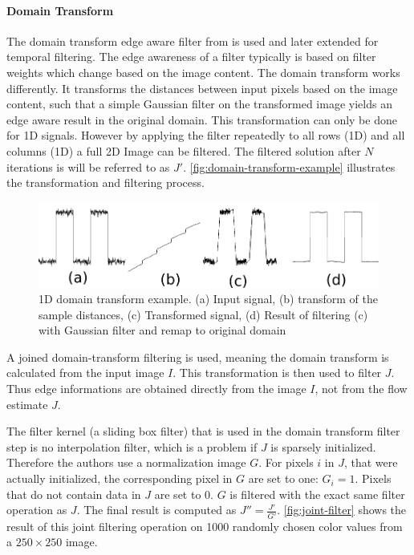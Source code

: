 \documentclass{utue} %
\begin{document}
\paragraph{Domain Transform} \label{domain-transform}
The domain transform edge aware filter from
\cite{GastalOliveira2011DomainTransform} is used and later extended for temporal
filtering. The edge awareness of a filter typically is based on filter weights
which change based on the image content. The domain transform works differently.
It transforms the distances between input pixels based on the image content,
such that a simple Gaussian filter on the transformed image yields an edge aware
result in the original domain. This transformation can only be done for 1D
signals.  However by applying the filter repeatedly to all rows (1D) and all
columns (1D) a full 2D Image can be filtered. The filtered solution after $N$
iterations is will be referred to as $J'$.
\autoref{fig:domain-transform-example} illustrates the transformation and
filtering process.

\begin{figure}[h!]
  \centering
  \includegraphics[width=.5\textwidth]{images/domain-transform.png}
  \caption{1D domain transform example. (a) Input signal, (b) transform
  of the sample distances, (c) Transformed signal, (d) Result of filtering (c) with
Gaussian filter and remap to original domain}
  \label{fig:domain-transform-example}
\end{figure}

A joined domain-transform filtering is used, meaning the domain transform is
calculated from the input image $I$. This transformation is then used to filter
$J$. Thus edge informations are obtained directly from the image $I$, not from
the flow estimate $J$.

The filter kernel (a sliding box filter) that is used in the domain transform
filter step is no interpolation filter, which is a problem if $J$ is sparsely
initialized.  Therefore the authors use a normalization image $G$. For pixels
$i$ in $J$, that were actually initialized, the corresponding pixel in $G$ are set
to one: $G_i = 1$.
Pixels that do not contain data in $J$ are set to 0. $G$ is filtered with the
exact same filter operation as $J$. The final result is computed as
$J''=\frac{J'}{G'}$.  \autoref{fig:joint-filter} shows the result of this joint
filtering operation on 1000 randomly chosen color values from a $250\times250$
image.
\end{document}
